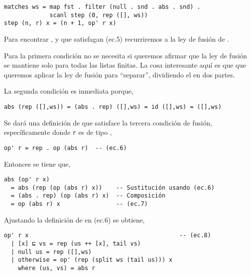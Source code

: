 \begin{verbatim}
matches ws = map fst . filter (null . snd . abs . snd) .
             scanl step (0, rep ([], ws))
step (n, r) x = (n + 1, op' r x)    
\end{verbatim}

Para encontrar ,  y  que satisfagan (ec.5) recurriremos a la ley de fusión de .

Para la primera condición no se necesita si queremos afirmar que la ley de fusión se mantiene solo para todas las listas finitas.
La cosa interesante aquí es que que queremos aplicar la ley de fusión para ``separar'', dividiendo el  en dos partes.

La segunda condición es inmediata porque,
\begin{verbatim}
abs (rep ([],ws)) = (abs . rep) ([],ws) = id ([],ws) = ([],ws)
\end{verbatim}

Se dará una definición de  que satisface la tercera condición de fusión,
específicamente donde \texttt{r} es de tipo ,
\begin{verbatim}
op' r = rep . op (abs r)  -- (ec.6)
\end{verbatim}

Entonces se tiene que,
\begin{verbatim}
abs (op' r x) 
  = abs (rep (op (abs r) x))    -- Sustitución usando (ec.6)
  = (abs . rep) (op (abs r) x)  -- Composición
  = op (abs r) x                -- (ec.7)
\end{verbatim}

Ajustando la definición de  en (ec.6) se obtiene,
\begin{verbatim}
op' r x                                           -- (ec.8)
  | [x] ⊑ vs = rep (us ++ [x], tail vs)
  | null us = rep ([],ws)
  | otherwise = op' (rep (split ws (tail us))) x
    where (us, vs) = abs r  
\end{verbatim}

